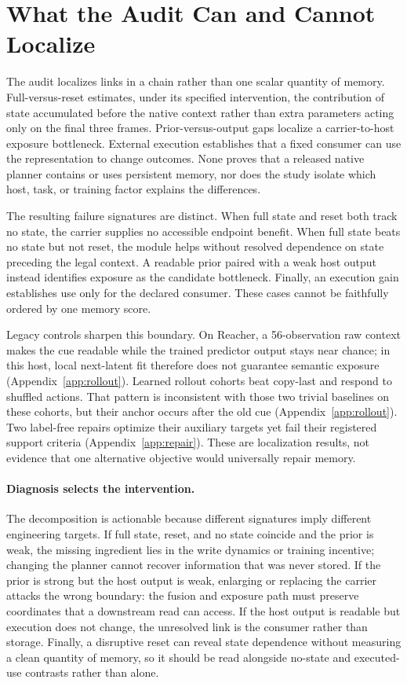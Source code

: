 \section{What the Audit Can and Cannot Localize}

The audit localizes links in a chain rather than one scalar quantity of memory.
Full-versus-reset estimates, under its specified intervention, the contribution
of state accumulated before the native context rather than extra parameters
acting only on the final three frames.  Prior-versus-output gaps localize a
carrier-to-host exposure bottleneck.  External execution establishes that a
fixed consumer can use the representation to change outcomes.  None proves
that a released native planner contains or uses persistent memory, nor does the
study isolate which host, task, or training factor explains the differences.

The resulting failure signatures are distinct.  When full state and reset both
track no state, the carrier supplies no accessible endpoint benefit.  When full
state beats no state but not reset, the module helps without resolved dependence
on state preceding the legal context.  A readable prior paired with a weak host
output instead identifies exposure as the candidate bottleneck.  Finally, an
execution gain establishes use only for the declared consumer.  These cases
cannot be faithfully ordered by one memory score.

Legacy controls sharpen this boundary.  On Reacher, a 56-observation raw
context makes the cue readable while the trained predictor output stays near
chance; in this host, local next-latent fit therefore does not guarantee
semantic exposure (Appendix~\ref{app:rollout}).  Learned rollout cohorts beat
copy-last and respond to shuffled actions.  That pattern is inconsistent with
those two trivial baselines on these cohorts, but their anchor occurs after the
old cue (Appendix~\ref{app:rollout}).  Two label-free repairs optimize their
auxiliary targets yet fail their registered support criteria
(Appendix~\ref{app:repair}).  These are localization results, not evidence that
one alternative objective would universally repair memory.

\paragraph{Diagnosis selects the intervention.}
The decomposition is actionable because different signatures imply different
engineering targets.  If full state, reset, and no state coincide and the prior
is weak, the missing ingredient lies in the write dynamics or training
incentive; changing the planner cannot recover information that was never
stored.  If the prior is strong but the host output is weak, enlarging or
replacing the carrier attacks the wrong boundary: the fusion and exposure path
must preserve coordinates that a downstream read can access.  If the host
output is readable but execution does not change, the unresolved link is the
consumer rather than storage.  Finally, a disruptive reset can reveal state
dependence without measuring a clean quantity of memory, so it should be read
alongside no-state and executed-use contrasts rather than alone.

